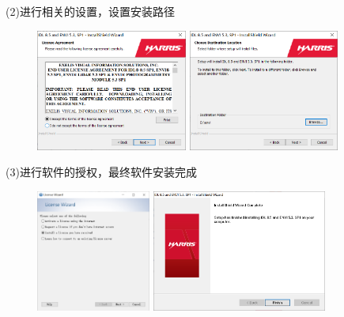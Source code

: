 \documentclass[12pt,a4paper]{article}
\begin{document}
		(2)进行相关的设置，设置安装路径
		
		\begin{figure}[H]
			\centering
			\begin{minipage}[t]{0.48\textwidth}
				\centering
				\includegraphics[height=4.0cm]{ins3}	
			\end{minipage}
			\begin{minipage}[t]{0.48\textwidth}
				\centering 
				\includegraphics[height=4.0cm]{ins4}
			\end{minipage}
		\end{figure}
	
		(3)进行软件的授权，最终软件安装完成
	
	\begin{figure}[H]
		\centering
		\begin{minipage}[t]{0.48\textwidth}
			\centering
			\includegraphics[height=4.0cm]{ins5}	
		\end{minipage}
		\begin{minipage}[t]{0.48\textwidth}
			\centering 
			\includegraphics[height=4.0cm]{ins6}
		\end{minipage}
	\end{figure}
	
\end{document}
